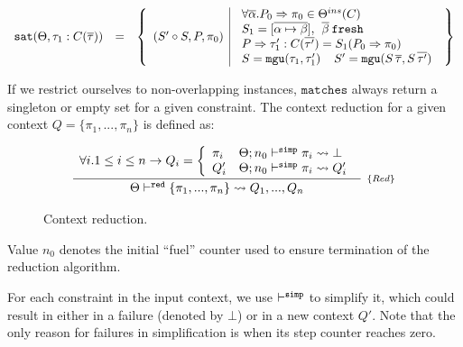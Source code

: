 \documentclass[a4paper, 11pt]{article}
\theoremstyle{definition}
\begin{document}
\[
  \begin{array}{lcl}
    \texttt{sat}(\Theta,\tau_1 : C(\overline{\tau})) & = & \left\{\begin{array}{l|l}
                                (S' \circ S, P, \pi_0) &
                                  \begin{array}{l}
                                    \forall\overline{\alpha} . P_0 \Rightarrow \pi_0 \in \Theta^{ins}(C) \\
                                    S_1 = [\overline{\alpha\mapsto\beta}],\:\:\overline{\beta}\:\mathtt{fresh}\\
                                    P \Rightarrow \tau'_1 : C(\overline{\tau'}) = S_1(P_0\Rightarrow \pi_0)\\
                                    S = \mathtt{mgu}(\tau_1, \tau'_1)\:\:\:\:\:S' = \mathtt{mgu}(S\,\overline{\tau},S\,\overline{\tau'})\\
                                  \end{array}
                             \end{array}\right\}
  \end{array}
\]


If we restrict ourselves to non-overlapping instances,
$\mathtt{matches}$ always return a singleton or empty set for
a given constraint. The context reduction for a given context
$Q = \{\pi_1,...,\pi_n\}$ is defined as:

\begin{figure}[H]
  \[
    \begin{array}{c}
      \infer[_{\{Red\}}]
            {\Theta \reduce \{\pi_1,...,\pi_n\} \leadsto Q_1,..., Q_n}
            {\begin{array}{l}
              \forall i. 1 \leq i \leq n \to Q_i = \left\{
                    \begin{array}{ll}
                      \pi_i & \Theta ; n_0\simp \pi_i \leadsto \bot \\
                      Q'_i & \Theta ; n_0 \simp \pi_i \leadsto Q'_i
                    \end{array}
                    \right.
             \end{array}}
    \end{array}
  \]
  \centering
  \caption{Context reduction.}
  \label{fig:context-reduction}
\end{figure}
Value $n_0$ denotes the initial ``fuel'' counter used to
ensure termination of the reduction algorithm.

For each constraint in the input context, we use $\vdash^{\mathtt{simp}}$ to
simplify it, which could result in either in a failure (denoted
by $\bot$) or in a new context $ Q'$. Note that the only reason for failures in
simplification is when its step counter reaches zero.
\end{document}
